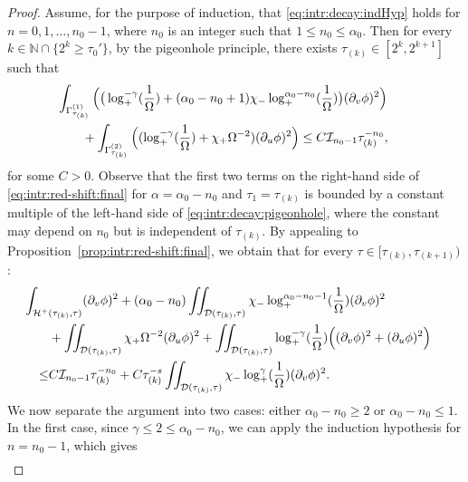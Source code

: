 \documentclass[10pt, reqno]{amsart}
\theoremstyle{definition}
\theoremstyle{remark}
\numberwithin{equation}{section}
\newcommand{\rd}{\partial}
\newcommand{\bb}{\Big}
\newcommand{\0}{\emptyset}
\newcommand{\alp}{\alpha}
\newcommand{\Gmm}{\Gamma}
\newcommand{\Omg}{\Omega}
\newcommand{\bbN}{\mathbb N}
\newcommand{\calD}{\mathcal D}
\newcommand{\calH}{\mathcal H}
\newcommand{\calI}{\mathcal I}
\newcommand{\f}{\frac}
\newcommand{\EH}{\calH^{+}}
\begin{document}
\begin{proof}
Assume, for the purpose of induction, that \eqref{eq:intr:decay:indHyp} holds for $n = 0, 1, \ldots, n_{0}-1$, where $n_{0}$ is an integer such that $1 \leq n_{0} \leq \alp_{0}$. Then for every $k \in \bbN\cap\{2^k\geq \tau_0'\}$, by the pigeonhole principle, there exists $\tau_{(k)} \in [2^{k}, 2^{k+1}]$ such that
\begin{equation} \label{eq:intr:decay:pigeonhole}
\begin{aligned}
& \hskip-2em
	\int_{\Gmm^{(1)}_{\tau_{(k)}}} \bb( \big( \log_+^{-\gamma}(\f{1}{\Omg}) + (\alp_{0} - n_{0} + 1) \chi_{-} \log_+^{\alp_{0} - n_{0}} (\frac{1}{\Omg}) \big) (\rd_{v} \phi)^{2} \bb) \\
	& + \int_{\Gmm^{(2)}_{\tau_{(k)}}} \bb( (\log_+^{-\gamma}(\f{1}{\Omg}) + \chi_{+} \Omg^{-2}) (\rd_{u} \phi)^{2}\bb)
	\leq C \calI_{n_{0}-1} \tau_{(k)}^{-n_{0}},
\end{aligned}
\end{equation}
for some $C > 0$. Observe that the first two terms on the right-hand side of \eqref{eq:intr:red-shift:final} for $\alp = \alp_{0} - n_{0}$ and $\tau_{1} = \tau_{(k)}$ is bounded by a constant multiple of the left-hand side of \eqref{eq:intr:decay:pigeonhole}, where the constant may depend on $n_{0}$ but is independent of $\tau_{(k)}$.
By appealing to Proposition~\ref{prop:intr:red-shift:final}, we obtain that for every $\tau\in [\tau_{(k)},\tau_{(k+1)})$:
\begin{equation} \label{intr:induction:generaln}
\begin{aligned}
& \hskip-2em
	 \int_{\EH(\tau_{(k)}, \tau)} (\rd_{v} \phi)^{2} 
	+  (\alp_0-n_0)\iint_{\calD(\tau_{(k)}, \tau)} \chi_{-} \log_+^{\alp_{0}-n_0-1} (\frac{1}{\Omg}) (\rd_{v} \phi)^{2} \\
	& +  \iint_{\calD(\tau_{(k)}, \tau)} \chi_{+} \Omg^{-2} (\rd_{u} \phi)^{2} 
	+  \iint_{\calD(\tau_{(k)}, \tau)} \log_+^{-\gamma}(\f{1}{\Omg}) \bb( (\rd_{v} \phi)^{2} + (\rd_{u} \phi)^{2} \bb)\\
	\leq &C\calI_{n_0-1}\tau_{(k)}^{-n_0}+C\tau_{(k)}^{-s}\iint_{\calD(\tau_{(k)}, \tau)} \chi_-\log_+^{\gamma}(\f{1}{\Omg})(\rd_v\phi)^2.
\end{aligned}
\end{equation}
We now separate the argument into two cases: either $\alp_0-n_0\geq 2$ or $\alp_0-n_0\leq 1$. In the first case, since $\gamma\leq 2\leq \alp_0-n_0$, we can apply the induction hypothesis for $n=n_0-1$, which gives
\begin{equation*}
\begin{split}

\end{split}
\end{equation*}
\end{proof}
\end{document}
